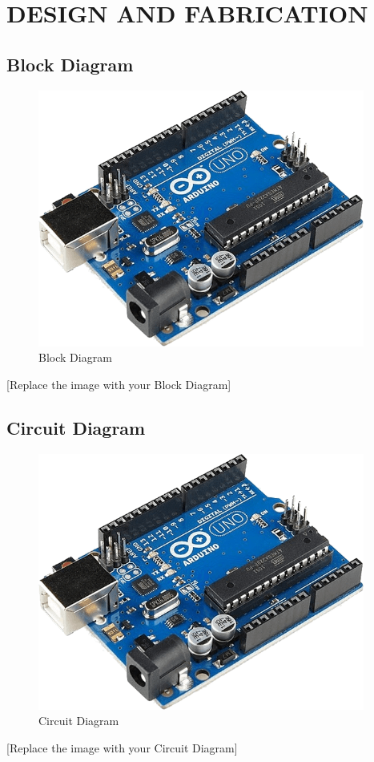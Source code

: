 
       \newpage
\chapter{DESIGN AND FABRICATION}


  

\begin{center}
    \section{Block Diagram}
\end{center}
\begin{figure}[H]
	\centering
	\includegraphics[width=10.75cm,height=8.44cm]{./figures/block_diagram.png}
        \caption{Block Diagram}
	\end{figure}
\begin{center}
    [Replace the image with your Block Diagram]
\end{center}
   
        \newpage
  \begin{center}
      \section{Circuit Diagram}
  \end{center}
  \begin{figure}[H]
	\centering
	\includegraphics[width=10.75cm,height=8.44cm]{./figures/circuit_diagram.png}
        \caption{Circuit Diagram}
	\end{figure}
 \begin{center}
     [Replace the image with your Circuit Diagram]
 \end{center}

